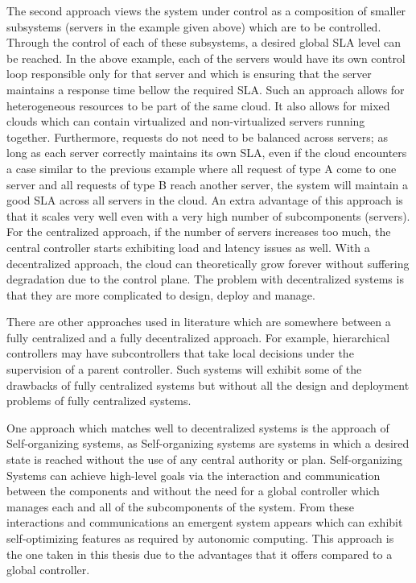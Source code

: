 The second approach views the system under control as a composition of smaller subsystems (servers in the example given above) which are to be controlled. Through the control of each of these subsystems, a desired global SLA level can be reached. In the above example, each of the servers would have its own control loop responsible only for that server and which is ensuring that the server maintains a response time bellow the required SLA. Such an approach allows for heterogeneous resources to be part of the same cloud. It also allows for mixed clouds which can contain virtualized and non-virtualized servers running together. Furthermore, requests do not need to be balanced across servers; as long as each server correctly maintains its own SLA, even if the cloud encounters a case similar to the previous example where all request of type A come to one server and all requests of type B reach another server, the system will maintain a good SLA across all servers in the cloud. An extra advantage of this approach is that it scales very well even with a very high number of subcomponents (servers). For the centralized approach, if the number of servers increases too much, the central controller starts exhibiting load and latency issues as well. With a decentralized approach, the cloud can theoretically grow forever without suffering degradation due to the control plane. The problem with decentralized systems is that they are more complicated to design, deploy and manage.

There are other approaches used in literature which are somewhere between a fully centralized and a fully decentralized approach. For example, hierarchical controllers may have subcontrollers that take local decisions under the supervision of a parent controller. Such systems will exhibit some of the drawbacks of fully centralized systems but without all the design and deployment problems of fully centralized systems.

One approach which matches well to decentralized systems is the approach of Self-organizing systems, as Self-organizing systems are systems in which a desired state is reached without the use of any central authority or plan. Self-organizing Systems can achieve high-level goals via the interaction and communication between the components and without the need for a global controller which manages each and all of the subcomponents of the system. From these interactions and communications an emergent system appears which can exhibit self-optimizing features as required by autonomic computing. This approach is the one taken in this thesis due to the advantages that it offers compared to a global controller.

